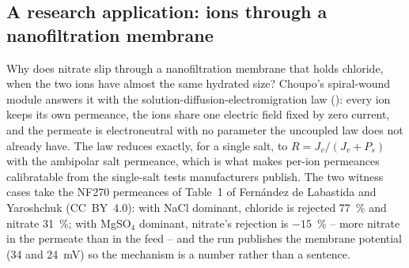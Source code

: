 \documentclass[11pt,a4paper]{article}
\newcommand{\code}[1]{\texttt{\detokenize{#1}}}
\begin{document}
\subsection{A research application: ions through a nanofiltration membrane}
\label{sec:ex-research}

Why does nitrate slip through a nanofiltration membrane that holds
chloride, when the two ions have almost the same hydrated size?  Choupo's
spiral-wound module answers it with the solution-diffusion-electromigration
law (\code{transport SDEM;}): every ion keeps its own permeance, the ions
share one electric field fixed by zero current, and the permeate is
electroneutral with no parameter the uncoupled law does not already have.
The law reduces exactly, for a single salt, to $R = J_v/(J_v + P_s)$ with
the ambipolar salt permeance, which is what makes per-ion permeances
calibratable from the single-salt tests manufacturers publish.  The two
witness cases take the NF270 permeances of Table~1 of Fernández de Labastida
and Yaroshchuk \citep{fdl2021} (CC~BY~4.0): with NaCl dominant, chloride is
rejected 77~\% and nitrate 31~\%; with MgSO$_4$ dominant, nitrate's rejection
is $-15$~\% -- more nitrate in the permeate than in the feed -- and the run
publishes the membrane potential (34 and 24~mV) so the mechanism is a
number rather than a sentence.
\end{document}
